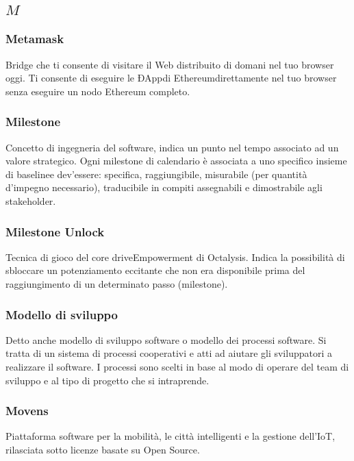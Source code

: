 \subsection*{\quad$M\quad$}
\subsubsection*{Metamask}
Bridge che ti consente di visitare il Web distribuito di domani nel tuo browser oggi. Ti consente di eseguire le ÐApp\glosp di Ethereum\glosp direttamente nel tuo browser senza eseguire un nodo Ethereum completo.

\subsubsection*{Milestone}
Concetto di ingegneria del software, indica un punto nel tempo associato ad un valore strategico. Ogni milestone di calendario è associata a uno specifico insieme di baseline\glo e dev'essere: specifica, raggiungibile, misurabile (per quantità d’impegno necessario), traducibile in compiti assegnabili e dimostrabile agli stakeholder\glo.

\subsubsection*{Milestone Unlock}
Tecnica di gioco del core drive\glosp Empowerment di Octalysis\glo. Indica la possibilità di sbloccare un potenziamento eccitante che non era disponibile prima del raggiungimento di un determinato passo (milestone).

\subsubsection*{Modello di sviluppo}
Detto anche modello di sviluppo software o modello dei processi software. Si tratta di un sistema di processi cooperativi e atti ad aiutare gli sviluppatori a realizzare il software. I processi sono scelti in base al modo di operare del team di sviluppo e al tipo di progetto che si intraprende.

\subsubsection*{Movens}
Piattaforma software per la mobilità, le città intelligenti e la gestione dell'IoT, rilasciata sotto licenze basate su Open Source\glo.
